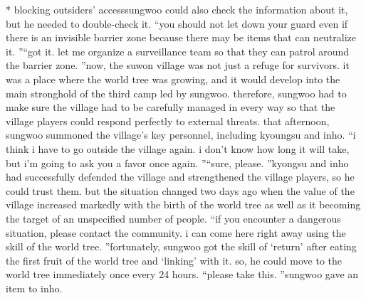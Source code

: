 * blocking outsiders’ accesssungwoo could also check the information about it, but he needed to double-check it.
“you should not let down your guard even if there is an invisible barrier zone because there may be items that can neutralize it.
”“got it.
 let me organize a surveillance team so that they can patrol around the barrier zone.
”now, the suwon village was not just a refuge for survivors.
 it was a place where the world tree was growing, and it would develop into the main stronghold of the third camp led by sungwoo.
therefore, sungwoo had to make sure the village had to be carefully managed in every way so that the village players could respond perfectly to external threats.
that afternoon, sungwoo summoned the village’s key personnel, including kyoungsu and inho.
“i think i have to go outside the village again.
 i don’t know how long it will take, but i’m going to ask you a favor once again.
”“sure, please.
”kyongsu and inho had successfully defended the village and strengthened the village players, so he could trust them.
but the situation changed two days ago when the value of the village increased markedly with the birth of the world tree as well as it becoming the target of an unspecified number of people.
“if you encounter a dangerous situation, please contact the community.
 i can come here right away using the skill of the world tree.
”fortunately, sungwoo got the skill of ‘return’ after eating the first fruit of the world tree and ‘linking’ with it.
 so, he could move to the world tree immediately once every 24 hours.
“please take this.
”sungwoo gave an item to inho.


 